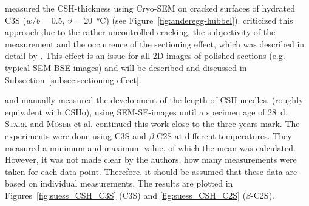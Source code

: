 \textcite{nicoleau.2011} measured the \ac{CSH}-thickness using Cryo-\ac{SEM} on cracked surfaces of hydrated \ac{C3S} ($w/b=0.5$, $\vartheta=$\SI{20}{\celsius}) (see Figure~\ref{fig:anderegg-hubbel}).
\textcite{bishnoi.2012} criticized this approach due to the rather uncontrolled cracking, the subjectivity of the measurement and the occurrence of the sectioning effect, which was described in detail by \textcite{scrivener.2004}.
This effect is an issue for all 2D images of polished sections (e.g. typical \ac{SEM}-\ac{BSE} images) and will be described and discussed in Subsection~\ref{subsec:sectioning-effect}.

\textcite{voland.2000} and \textcite{suss.2001} manually measured the development of the length of \ac{CSH}-needles, (roughly equivalent with \ac{CSHo}), using \ac{SEM}-\ac{SE}-images until a specimen age of \SI{28}{\day}.
\textsc{Stark} and \textsc{Möser} et al. \cite{stark.2001,moser.2001,moser.2002} continued this work close to the three years mark.
The experiments were done using \ac{C3S} and $\beta$-\ac{C2S} at different temperatures.
They measured a minimum and maximum value, of which the mean was calculated.
However, it was not made clear by the authors, how many measurements were taken for each data point. Therefore, it should be assumed that these data are based on individual measurements.
The results are plotted in Figures~\ref{fig:suess_CSH_C3S} (\ac{C3S}) and \ref{fig:suess_CSH_C2S} ($\beta$-\ac{C2S}).

